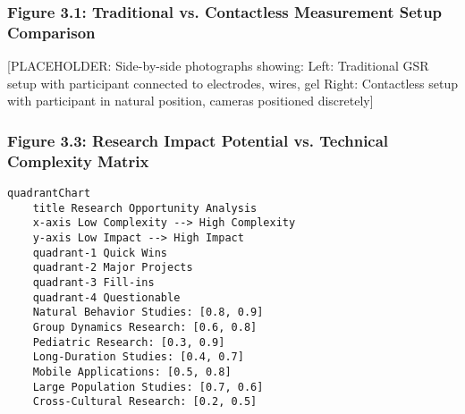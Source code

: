 \documentclass[12pt,a4paper]{article}
\begin{document}
\subsubsection{Figure 3.1: Traditional vs. Contactless Measurement Setup Comparison}

[PLACEHOLDER: Side-by-side photographs showing:
Left: Traditional GSR setup with participant connected to electrodes, wires, gel
Right: Contactless setup with participant in natural position, cameras positioned discretely]

\subsubsection{Figure 3.3: Research Impact Potential vs. Technical Complexity Matrix}

\begin{verbatim}
quadrantChart
    title Research Opportunity Analysis
    x-axis Low Complexity --> High Complexity
    y-axis Low Impact --> High Impact
    quadrant-1 Quick Wins
    quadrant-2 Major Projects
    quadrant-3 Fill-ins
    quadrant-4 Questionable
    Natural Behavior Studies: [0.8, 0.9]
    Group Dynamics Research: [0.6, 0.8]
    Pediatric Research: [0.3, 0.9]
    Long-Duration Studies: [0.4, 0.7]
    Mobile Applications: [0.5, 0.8]
    Large Population Studies: [0.7, 0.6]
    Cross-Cultural Research: [0.2, 0.5]
\end{verbatim}
\end{document}
